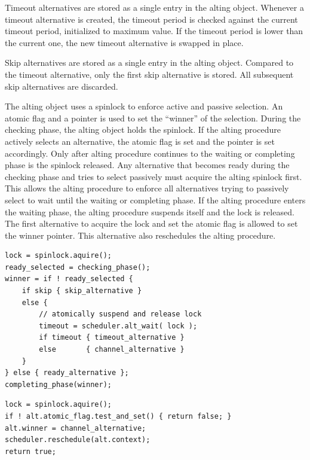 Timeout alternatives are stored as a single entry in the alting object. Whenever a timeout alternative is created, the timeout period is checked against the current timeout period, initialized to maximum value. If the timeout period is lower than the current one, the new timeout alternative is swapped in place.

Skip alternatives are stored as a single entry in the alting object. Compared to the timeout alternative, only the first skip alternative is stored. All subsequent skip alternatives are discarded.

The alting object uses a spinlock to enforce active and passive selection. An atomic flag and a pointer is used to set the ``winner'' of the selection. During the checking phase, the alting object holds the spinlock. If the alting procedure actively selects an alternative, the atomic flag is set and the pointer is set accordingly. Only after alting procedure continues to the waiting or completing phase is the spinlock released. Any alternative that becomes ready during the checking phase and tries to select passively must acquire the alting spinlock first. This allows the alting procedure to enforce all alternatives trying to passively select to wait until the waiting or completing phase. 
If the alting procedure enters the waiting phase, the alting procedure suspends itself and the lock is released. The first alternative to acquire the lock and set the atomic flag is allowed to set the winner pointer. This alternative also reschedules the alting procedure. 

\begin{lstfloat}
\begin{lstlisting}[caption={Code example of alting.}, label={lst:active_alting}, style={CustomC}]
lock = spinlock.aquire();
ready_selected = checking_phase();
winner = if ! ready_selected {
    if skip { skip_alternative }
    else {
        // atomically suspend and release lock
        timeout = scheduler.alt_wait( lock );
        if timeout { timeout_alternative }
        else       { channel_alternative }
    }
} else { ready_alternative };
completing_phase(winner);
\end{lstlisting}
\end{lstfloat}

\begin{lstfloat}
\begin{lstlisting}[caption={Code example of alting.}, label={lst:passive_alting}, style={CustomC}]
lock = spinlock.aquire();
if ! alt.atomic_flag.test_and_set() { return false; }
alt.winner = channel_alternative;
scheduler.reschedule(alt.context);
return true;
\end{lstlisting}
\end{lstfloat}


